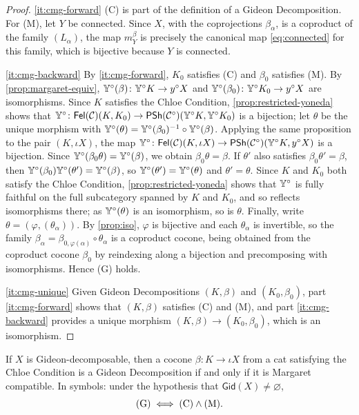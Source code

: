 \begin{proof}
\ref{it:cmg-forward} (C) is part of the definition of a Gideon Decomposition.
For (M), let $Y$ be connected. Since $X$, with the coprojections $\beta_\alpha$,
is a coproduct of the family $(L_\alpha)$, the map $m^\beta_Y$ is precisely the
canonical map \eqref{eq:connected} for this family, which is bijective because
$Y$ is connected.

\ref{it:cmg-backward} By \ref{it:cmg-forward}, $K_0$ satisfies (C) and $\beta_0$
satisfies (M). By \cref{prop:margaret-equiv}, $\mathbb{Y}^\circ(\beta)\colon\mathbb{Y}^\circ K\to y^\circ X$
and $\mathbb{Y}^\circ(\beta_0)\colon\mathbb{Y}^\circ K_0\to y^\circ X$ are isomorphisms. Since $K$
satisfies the Chloe Condition, \cref{prop:restricted-yoneda} shows that
$\mathbb{Y}^\circ\colon\mathsf{Fel}(\mathcal{C})(K,K_0)\to\mathsf{PSh}(\mathcal{C}^\circ)(\mathbb{Y}^\circ K,\mathbb{Y}^\circ K_0)$ is
a bijection; let $\theta$ be the unique morphism with
$\mathbb{Y}^\circ(\theta)=\mathbb{Y}^\circ(\beta_0)^{-1}\circ\mathbb{Y}^\circ(\beta)$. Applying the same
proposition to the pair $(K,\iota X)$, the map
$\mathbb{Y}^\circ\colon\mathsf{Fel}(\mathcal{C})(K,\iota X)\to\mathsf{PSh}(\mathcal{C}^\circ)(\mathbb{Y}^\circ K,y^\circ X)$ is a
bijection. Since $\mathbb{Y}^\circ(\beta_0\theta)=\mathbb{Y}^\circ(\beta)$, we obtain
$\beta_0\theta=\beta$. If $\theta'$ also satisfies $\beta_0\theta'=\beta$, then
$\mathbb{Y}^\circ(\beta_0)\mathbb{Y}^\circ(\theta')=\mathbb{Y}^\circ(\beta)$, so
$\mathbb{Y}^\circ(\theta')=\mathbb{Y}^\circ(\theta)$ and $\theta'=\theta$. Since $K$ and
$K_0$ both satisfy the Chloe Condition, \cref{prop:restricted-yoneda} shows that
$\mathbb{Y}^\circ$ is fully faithful on the full subcategory spanned by $K$ and $K_0$,
and so reflects isomorphisms there; as $\mathbb{Y}^\circ(\theta)$ is an isomorphism,
so is $\theta$. Finally, write $\theta=(\varphi,(\theta_\alpha))$. By
\cref{prop:iso}, $\varphi$ is bijective and each $\theta_\alpha$ is invertible, so
the family $\beta_\alpha=\beta_{0,\varphi(\alpha)}\circ\theta_\alpha$ is a coproduct cocone,
being obtained from the coproduct cocone $\beta_0$ by reindexing along a
bijection and precomposing with isomorphisms. Hence (G) holds.

\ref{it:cmg-unique} Given Gideon Decompositions $(K,\beta)$ and $(K_0,\beta_0)$,
part \ref{it:cmg-forward} shows that $(K,\beta)$ satisfies (C) and (M), and part
\ref{it:cmg-backward} provides a unique morphism $(K,\beta)\to(K_0,\beta_0)$,
which is an isomorphism.
\end{proof}

\begin{corollary}\label{cor:cmg-iff}
If $X$ is Gideon-decomposable, then a cocone $\beta\colon K\to\iota X$ from a cat
satisfying the Chloe Condition is a Gideon Decomposition if and only if it is
Margaret compatible. In symbols: under the hypothesis that $\mathsf{Gid}(X)\neq\varnothing$,
\[
\textup{(G)}\iff\textup{(C)}\wedge\textup{(M)}.
\]
\end{corollary}

